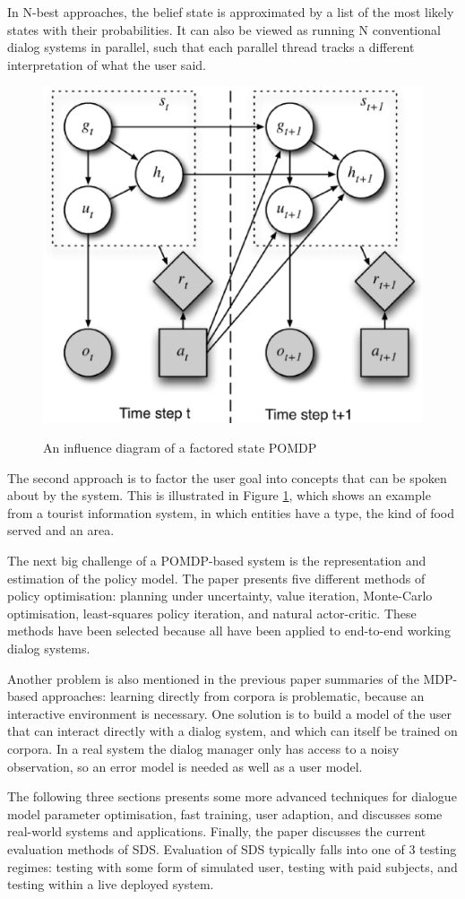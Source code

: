 \documentclass[paper=a4, fontsize=18pt]{article} %
\numberwithin{equation}{section} %
\numberwithin{figure}{section} %
\numberwithin{table}{section} %
\begin{document}
In N-best approaches, the belief state is approximated by a list of the most likely states with their probabilities. It can also be viewed as running N conventional dialog systems in parallel, such that each parallel thread tracks a different interpretation of what the user said.

\begin{figure}[htbp]
  \centering
  \includegraphics[width=.5\linewidth]{10_17_POMDP3}\\
  \caption{An influence diagram of a factored state POMDP}\label{fig:POMDP3}
\end{figure}

The second approach is to factor the user goal into concepts that can be spoken about by the system. This is illustrated in Figure \ref{fig:POMDP3}, which shows an example from a tourist information system, in which entities have a type, the kind of food served and an area.

The next big challenge of a POMDP-based system is the representation and estimation of the policy model. The paper presents five different methods of policy optimisation: planning under uncertainty, value iteration, Monte-Carlo optimisation, least-squares policy iteration, and natural actor-critic. These methods have been selected because all have been applied to end-to-end working dialog systems.

Another problem is also mentioned in the previous paper summaries of the MDP-based approaches: learning directly from corpora is problematic, because an interactive environment is necessary. One solution is to build a model of the user that can interact directly with a dialog system, and which can itself be trained on corpora. In a real system the dialog manager only has access to a noisy observation, so an error model is needed as well as a user model.

The following three sections presents some more advanced techniques for dialogue model parameter optimisation, fast training, user adaption, and discusses some real-world systems and applications. Finally, the paper discusses the current evaluation methods of SDS. Evaluation of SDS typically falls into one of 3 testing regimes: testing with some form of simulated user, testing with paid subjects, and testing within a live deployed system.
\end{document}
